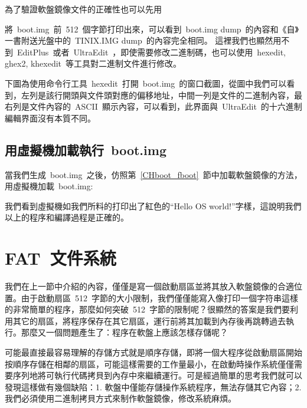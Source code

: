 為了驗證軟盤鏡像文件的正確性也可以先用
將~boot.img~前~512~個字節打印出來，可以看到~boot.img dump~的內容和《自》一書附送光盤中的~TINIX.IMG dump~的內容完全相同。
這裡我們也顯然用不到~EditPlus~或者~UltraEdit~，即使需要修改二進制碼，也可以使用~hexedit, ghex2, khexedit~等工具對二進制文件進行修改。

下圖為使用命令行工具~hexedit~打開~boot.img~的窗口截圖，從圖中我們可以看到，左列是該行開頭與文件頭對應的偏移地址，中間一列是文件的二進制內容，最右列是文件內容的~ASCII~顯示內容，可以看到，此界面與~UltraEdit~的十六進制編輯界面沒有本質不同。



\subsection{用虛擬機加載執行~boot.img}

當我們生成~boot.img~之後，仿照第~\ref{CHboot_fboot}~節中加載軟盤鏡像的方法，用虛擬機加載~boot.img:\\


我們看到虛擬機如我們所料的打印出了紅色的“Hello OS world!”字樣，這說明我們以上的程序和編譯過程是正確的。

\section{FAT~文件系統}

我們在上一節中介紹的內容，僅僅是寫一個啟動扇區並將其放入軟盤鏡像的合適位置。由于啟動扇區~512~字節的大小限制，我們僅僅能寫入像打印一個字符串這樣的非常簡單的程序，那麼如何突破~512~字節的限制呢？很顯然的答案是我們要利用其它的扇區，將程序保存在其它扇區，運行前將其加載到內存後再跳轉過去執行。那麼又一個問題產生了：程序在軟盤上應該怎樣存儲呢？

可能最直接最容易理解的存儲方式就是順序存儲，即將一個大程序從啟動扇區開始按順序存儲在相鄰的扇區，可能這樣需要的工作量最小，在啟動時操作系統僅僅需要序列地將可執行代碼拷貝到內存中來繼續運行。可是經過簡單的思考我們就可以發現這樣做有幾個缺陷：1. 軟盤中僅能存儲操作系統程序，無法存儲其它內容；2. 我們必須使用二進制拷貝方式來制作軟盤鏡像，修改系統麻煩。

